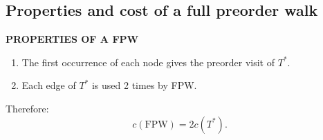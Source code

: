 \subsection{Properties and cost of a full preorder walk}
\begin{notesresult}
\textbf{PROPERTIES OF A FPW}
\begin{enumerate}
\item The first occurrence of each node gives the preorder visit of $T^*$.
\item Each edge of $T^*$ is used 2 times by FPW.
\end{enumerate}
\end{notesresult}
Therefore:
\[c(\mathrm{FPW})=2c(T^*).\]
